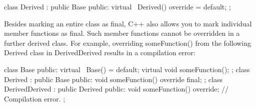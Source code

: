 \begin{cpp}
class Derived : public Base
{
    public:
        virtual ~Derived() override = default;
};
\end{cpp}


Besides marking an entire class as final, C++ also allows you to mark individual member functions as final. Such member functions cannot be overridden in a further derived class. For example, overriding someFunction() from the following Derived class in DerivedDerived results in a compilation error:

\begin{cpp}
class Base
{
    public:
        virtual ~Base() = default;
        virtual void someFunction();
};
class Derived : public Base
{
    public:
        void someFunction() override final;
};
class DerivedDerived : public Derived
{
    public:
        void someFunction() override; // Compilation error.
};
\end{cpp}






